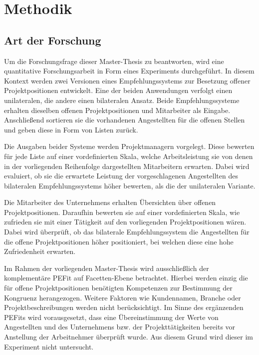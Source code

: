 \chapter{Methodik}
\label{ch:methodik}

\section{Art der Forschung}
\label{ch:methodik:art}
Um die Forschungsfrage dieser Master-Thesis zu beantworten, wird eine quantitative Forschungsarbeit in Form eines Experiments durchgeführt. In diesem Kontext werden zwei Versionen eines Empfehlungssystems zur Besetzung offener Projektpositionen entwickelt. Eine der beiden Anwendungen verfolgt einen unilateralen, die andere einen bilateralen Ansatz. Beide Empfehlungssysteme erhalten dieselben offenen Projektpositionen und Mitarbeiter als Eingabe. Anschließend sortieren sie die vorhandenen Angestellten für die offenen Stellen und geben diese in Form von Listen zurück.

Die Ausgaben beider Systeme werden Projektmanagern vorgelegt. Diese bewerten für jede Liste auf einer vordefinierten Skala, welche Arbeitsleistung sie von denen in der vorliegenden Reihenfolge dargestellten Mitarbeitern erwarten. Dabei wird evaluiert, ob sie die erwartete Leistung der vorgeschlagenen Angestellten des bilateralen Empfehlungssystems höher bewerten, als die der unilateralen Variante.

Die Mitarbeiter des Unternehmens erhalten Übersichten über offenen Projektpositionen. Daraufhin bewerten sie auf einer vordefinierten Skala, wie zufrieden sie mit einer Tätigkeit auf den vorliegenden Projektpositionen wären. Dabei wird überprüft, ob das bilaterale Empfehlungssystem die Angestellten für die offene Projektpositionen höher positioniert, bei welchen diese eine hohe Zufriedenheit erwarten.

Im Rahmen der vorliegenden Master-Thesis wird ausschließlich der komplementäre \ac{PEFit} auf Facetten-Ebene betrachtet. Hierbei werden einzig die für offene Projektpositionen benötigten Kompetenzen zur Bestimmung der Kongruenz herangezogen. Weitere Faktoren wie Kundennamen, Branche oder Projektbeschreibungen werden nicht berücksichtigt. Im Sinne des ergänzenden \acp{PEFit} wird vorausgesetzt, dass eine Übereinstimmung der Werte von Angestellten und des Unternehmens bzw. der Projekttätigkeiten bereits vor Anstellung der Arbeitnehmer überprüft wurde. Aus diesem Grund wird dieser im Experiment nicht untersucht.


